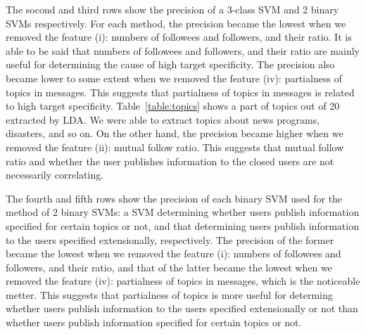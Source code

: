 The socond and third rows show the precision of a 3-class SVM
and 2 binary SVMs respectively.  For each method, the precision became
the lowest when we removed the feature (i): numbers of followees and
followers, and their ratio.  It is able to be said that numbers of
followees and followers, and their ratio are mainly useful for
determining the cause of high target specificity.  The precision also
became lower to some extent when we removed the feature (iv):
partialness of topics in messages.  This suggests that partialness of
topics in messages is related to high target specificity.
Table~\ref{table:topics} shows a part of topics out of 20 extracted by
LDA.  We were able to extract topics about news programs, disasters, and
so on.  On the other hand, the precision became higher when we removed
the feature (ii): mutual follow ratio.  This suggests that mutual
follow ratio and whether the user publishes information to the closed
users are not necessarily correlating.

The fourth and fifth rows show the precision of each binary SVM used for
the method of 2 binary SVMs: a SVM determining whether users publish
information specified for certain topics or not, and that determining
users publish information to the users specified extensionally,
respectively.  The precision of the former became the lowest when we
removed the feature (i): numbers of followees and followers, and their
ratio, and that of the latter became the lowest when we removed the
feature (iv): partialness of topics in messages, which is the noticeable
metter.  This suggests that partialness of topics is more useful for
determing whether users publish information to the users specified
extensionally or not than whether users publish information specified
for certain topics or not.
